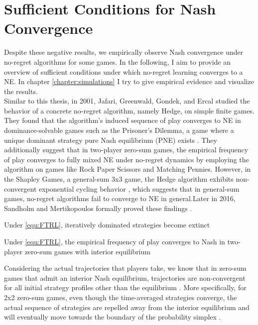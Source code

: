 \section{Sufficient Conditions for Nash Convergence}\label{section:SufficientConditionsForNash Convergence}

Despite these negative results, we empirically observe Nash convergence under no-regret algorithms for some games. In the following, I aim to provide an overview of sufficient conditions under which no-regret learning converges to a NE. In chapter \ref{chapter:simulations} I try to give empirical evidence and visualize the results. \\

Similar to this thesis, in 2001, Jafari, Greenwald, Gondek, and Ercal studied the behavior of a concrete no-regret algorithm, namely Hedge, on simple finite games. They found that the algorithm's induced sequence of play converges to NE in dominance-solvable games such as the Prisoner's Dilemma, a game where a unique dominant strategy pure Nash equilibrium (PNE) exists \cite{jafari}. They additionally suggest that in two-player zero-sum games, the empirical frequency of play converges to fully mixed NE under no-regret dynamics by employing the algorithm on games like Rock Paper Scissors and Matching Pennies. However, in the Shapley Games, a general-sum 3x3 game, the Hedge algorithm exhibits non-convergent exponential cycling behavior \cite{jafari}, which suggests that in general-sum games, no-regret algorithms fail to converge to NE in general.Later in 2016, Sandholm and Mertikopoulos formally proved these findings \cite[Theorem 4.1 and Theorem 6.1]{sandholm}.

\begin{proposition}\label{prop:dominantedStrategiesExtinct}
    Under \ref{equ:FTRL}, iteratively dominated strategies become extinct
\end{proposition}

\begin{proposition}\label{prop:empiricalFrequencyConvergence}
    Under \ref{equ:FTRL}, the empirical frequency of play converges to Nash in two-player zero-sum games with interior equilibrium
\end{proposition}

Considering the actual trajectories that players take, we know that in zero-sum games that admit an interior Nash equilibrium, trajectories are non-convergent for all initial strategy profiles other than the equilibrium \cite{bailey}. More specifically, for 2x2 zero-sum games, even though the time-averaged strategies converge, the actual sequence of strategies are repelled away from the interior equilibrium and will eventually move towards the boundary of the probability simplex \cite[Theorem 1]{bailey}. \\

